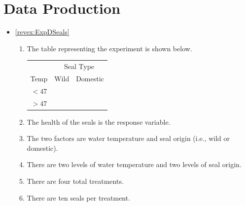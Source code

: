 \documentclass[10pt,openany]{book}\usepackage[]{graphicx}\usepackage[]{color}
\begin{document}
\section*{Data Production}
\begin{itemize}
  \item \hypertarget{ans:ExpDSeals}{\ref{revex:ExpDSeals}}
    \begin{enumerate}
      \item The table representing the experiment is shown below.

\begin{tabular}{cc|c|}
 & \multicolumn{2}{c}{Seal Type} \\
\cline{2-3}
\multicolumn{1}{c|}{Temp} & Wild & Domestic \\
\hline
\multicolumn{1}{c|}{$<47$} &  & \multicolumn{1}{c|}{} \\
\hline
\multicolumn{1}{c|}{$>47$} &  &  \multicolumn{1}{c|}{} \\
\cline{2-3}
\end{tabular}

      \item The health of the seals is the response variable.
      \item The two factors are water temperature and seal origin (i.e., wild or domestic).
      \item There are two levels of water temperature and two levels of seal origin.
      \item There are four total treatments.
      \item There are ten seals per treatment.
    \end{enumerate}


\end{itemize}
\end{document}
